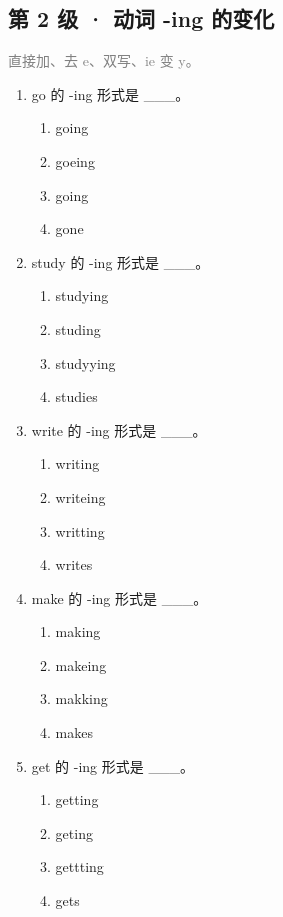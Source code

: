 \documentclass[11pt,a4paper]{ctexart}
\begin{document}
\subsection*{第 2 级 · 动词 -ing 的变化}
\noindent\textcolor{gray}{直接加、去 e、双写、ie 变 y。}\par\smallskip
\begin{enumerate}[leftmargin=*,itemsep=4pt]
\item go 的 -ing 形式是 \_\_\_。
\begin{enumerate}[label=\Alph*.,leftmargin=2em,itemsep=1pt,topsep=2pt]
\item going
\item goeing
\item going
\item gone
\end{enumerate}
\item study 的 -ing 形式是 \_\_\_。
\begin{enumerate}[label=\Alph*.,leftmargin=2em,itemsep=1pt,topsep=2pt]
\item studying
\item studing
\item studyying
\item studies
\end{enumerate}
\item write 的 -ing 形式是 \_\_\_。
\begin{enumerate}[label=\Alph*.,leftmargin=2em,itemsep=1pt,topsep=2pt]
\item writing
\item writeing
\item writting
\item writes
\end{enumerate}
\item make 的 -ing 形式是 \_\_\_。
\begin{enumerate}[label=\Alph*.,leftmargin=2em,itemsep=1pt,topsep=2pt]
\item making
\item makeing
\item makking
\item makes
\end{enumerate}
\item get 的 -ing 形式是 \_\_\_。
\begin{enumerate}[label=\Alph*.,leftmargin=2em,itemsep=1pt,topsep=2pt]
\item getting
\item geting
\item gettting
\item gets

\end{enumerate}
\end{enumerate}
\end{document}
